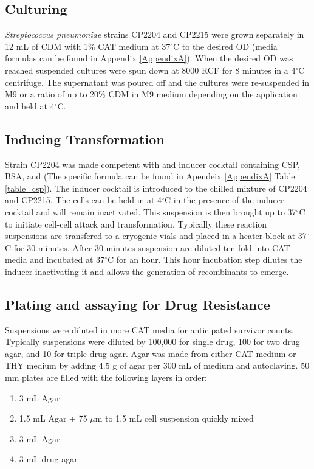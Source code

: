 \subsection{Culturing}

\textit{Streptococcus pneumoniae} strains CP2204 and CP2215 were grown separately in 12 mL of CDM with 1\% CAT medium at 37$^{\circ}$C to the desired OD (media formulas can be found in Appendix \ref{AppendixA}).
When the desired OD was reached suspended cultures were spun down at 8000 RCF for 8 minutes in a 4$^{\circ}$C centrifuge.
The supernatant was poured off and the cultures were re-suspended in M9 or a ratio of up to 20\% CDM in M9 medium depending on the application and held at 4$^{\circ}$C.

\subsection{Inducing Transformation}

Strain CP2204 was made competent with and inducer cocktail containing CSP, BSA, and  (The specific formula can be found in Apendeix \ref{AppendixA} Table \ref{table_csp}).
The inducer cocktail is introduced to the chilled mixture of CP2204 and CP2215.
The cells can be held in at 4$^{\circ}$C in the presence of the inducer cocktail and will remain inactivated.
This suspension is then brought up to 37$^{\circ}$C to initiate cell-cell attack and transformation.
Typically these reaction suspensions are transfered to a cryogenic vials and placed in a heater block at 37$^{\circ}$C for 30 minutes.
After 30 minutes suspension are diluted ten-fold into CAT media and incubated at 37$^{\circ}$C for an hour.
This hour incubation step dilutes the inducer inactivating it and allows the generation of recombinants to emerge.

\subsection{Plating and assaying for Drug Resistance}

Suspensions were diluted in more CAT media for anticipated survivor counts.
Typically suspensions were diluted by 100,000 for single drug, 100 for two drug agar, and 10 for triple drug agar.
Agar was made from either CAT medium or THY medium by adding 4.5 g of agar per 300 mL of medium and autoclaving.
50 mm plates are filled with the following layers in order: 

\begin{enumerate}
\item 3 mL Agar
\item 1.5 mL Agar + 75 $\mu$m to 1.5 mL cell suspension quickly mixed
\item 3 mL Agar
\item 3 mL drug agar
\end{enumerate}

